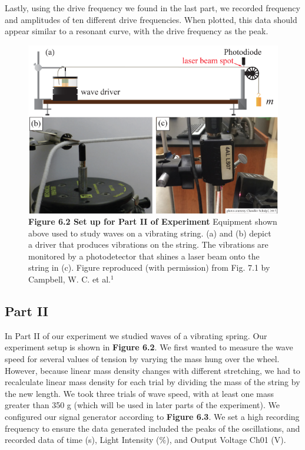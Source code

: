 \documentclass[11pt]{report}
\begin{document}
Lastly, using the drive frequency we found in the last part, we recorded frequency
and amplitudes of ten different drive frequencies. When plotted, this data should
appear similar to a resonant curve, with the drive frequency as the peak.

\begin{figure}[h!]
    \includegraphics[width=\linewidth]{Part2Setup.png}
    \captionsetup{labelformat=empty}
    \caption{\textbf{Figure 6.2 Set up for Part II of Experiment}  Equipment
        shown above used to study waves on a vibrating string.  (a) and (b) depict a
driver that produces vibrations on the string.  The vibrations are monitored by
a photodetector that shines a laser beam onto the string in (c). Figure
reproduced (with permission) from Fig. 7.1 by Campbell, W. C. et al.$^1$}
\end{figure}

\subsection*{Part II}

In Part II of our experiment we studied waves of a vibrating spring.  Our
experiment setup is shown in \textbf{Figure 6.2}. We first
wanted to measure the wave speed for several values of tension by varying the
mass hung over the wheel.  However, because linear mass density changes with
different stretching, we had to recalculate linear mass density for each trial
by dividing the mass of the string by the new length.  We took three trials of
wave speed, with at least one mass greater than 350 g (which will be used in
later parts of the experiment). We configured our signal generator according to 
\textbf{Figure 6.3}.  We set a high recording frequency to ensure the data
generated included the peaks of the oscillations, and recorded data of time (s), 
Light Intensity ($\%$), and Output Voltage Ch01 (V). 
\end{document}
